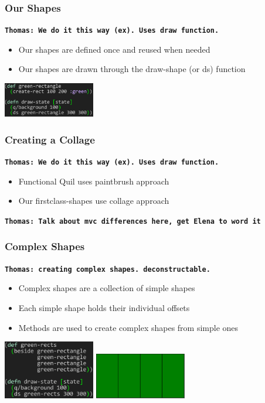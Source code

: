 \documentclass{beamer}
\newcommand{\comment}[1]{{\bf \tt  {#1}}}
\newcommand{\thcomment}[1]{\textcolor{BestBlue}{\comment{Thomas: {#1}}}}
\begin{document}
\begin{frame}
\frametitle{Our Shapes}
\thcomment{We do it this way (ex). Uses draw function.}
	\begin{itemize}
		\item Our shapes are defined once and reused when needed
		\item Our shapes are drawn through the draw-shape (or ds) function
	\end{itemize}
	\includegraphics[width=4cm]{PresentationImages/fcsGreenRect.png}
\end{frame}

\begin{frame}
\frametitle{Creating a Collage}
\thcomment{We do it this way (ex). Uses draw function.}
	\begin{itemize}
		\item Functional Quil uses paintbrush approach
		\item Our firstclass-shapes use collage approach
	\end{itemize}
\thcomment{Talk about mvc differences here, get Elena to word it}
\end{frame}

\begin{frame}
\frametitle{Complex Shapes}
\thcomment{creating complex shapes. deconstructable.}
	\begin{itemize}
		\item Complex shapes are a collection of simple shapes
		\item Each simple shape holds their individual offsets
		\item Methods are used to create complex shapes from simple ones
	\end{itemize}
	\includegraphics[width=4cm]{PresentationImages/fcsGreenRects.png}
	\includegraphics[width=4cm]{PresentationImages/4GreenRects.png}
\end{frame}
\end{document}
